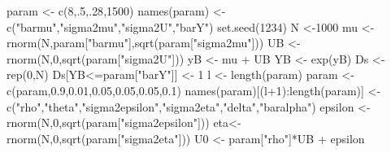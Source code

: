 \documentclass[
]{book}
\newenvironment{Shaded}{\begin{snugshade}}{\end{snugshade}}
\newcommand{\DecValTok}[1]{\textcolor[rgb]{0.00,0.00,0.81}{#1}}
\newcommand{\FloatTok}[1]{\textcolor[rgb]{0.00,0.00,0.81}{#1}}
\newcommand{\FunctionTok}[1]{\textcolor[rgb]{0.00,0.00,0.00}{#1}}
\newcommand{\NormalTok}[1]{#1}
\newcommand{\OtherTok}[1]{\textcolor[rgb]{0.56,0.35,0.01}{#1}}
\newcommand{\SpecialCharTok}[1]{\textcolor[rgb]{0.00,0.00,0.00}{#1}}
\newcommand{\StringTok}[1]{\textcolor[rgb]{0.31,0.60,0.02}{#1}}
\theoremstyle{definition}
\theoremstyle{definition}
\theoremstyle{definition}
\theoremstyle{definition}
\theoremstyle{remark}
\begin{document}
\begin{Shaded}
\begin{Highlighting}[]
\NormalTok{param }\OtherTok{\textless{}{-}} \FunctionTok{c}\NormalTok{(}\DecValTok{8}\NormalTok{,.}\DecValTok{5}\NormalTok{,.}\DecValTok{28}\NormalTok{,}\DecValTok{1500}\NormalTok{)}
\FunctionTok{names}\NormalTok{(param) }\OtherTok{\textless{}{-}} \FunctionTok{c}\NormalTok{(}\StringTok{"barmu"}\NormalTok{,}\StringTok{"sigma2mu"}\NormalTok{,}\StringTok{"sigma2U"}\NormalTok{,}\StringTok{"barY"}\NormalTok{)}
\FunctionTok{set.seed}\NormalTok{(}\DecValTok{1234}\NormalTok{)}
\NormalTok{N }\OtherTok{\textless{}{-}}\DecValTok{1000}
\NormalTok{mu }\OtherTok{\textless{}{-}} \FunctionTok{rnorm}\NormalTok{(N,param[}\StringTok{"barmu"}\NormalTok{],}\FunctionTok{sqrt}\NormalTok{(param[}\StringTok{"sigma2mu"}\NormalTok{]))}
\NormalTok{UB }\OtherTok{\textless{}{-}} \FunctionTok{rnorm}\NormalTok{(N,}\DecValTok{0}\NormalTok{,}\FunctionTok{sqrt}\NormalTok{(param[}\StringTok{"sigma2U"}\NormalTok{]))}
\NormalTok{yB }\OtherTok{\textless{}{-}}\NormalTok{ mu }\SpecialCharTok{+}\NormalTok{ UB}
\NormalTok{YB }\OtherTok{\textless{}{-}} \FunctionTok{exp}\NormalTok{(yB)}
\NormalTok{Ds }\OtherTok{\textless{}{-}} \FunctionTok{rep}\NormalTok{(}\DecValTok{0}\NormalTok{,N)}
\NormalTok{Ds[YB}\SpecialCharTok{\textless{}=}\NormalTok{param[}\StringTok{"barY"}\NormalTok{]] }\OtherTok{\textless{}{-}} \DecValTok{1}
\NormalTok{l }\OtherTok{\textless{}{-}} \FunctionTok{length}\NormalTok{(param)}
\NormalTok{param }\OtherTok{\textless{}{-}} \FunctionTok{c}\NormalTok{(param,}\FloatTok{0.9}\NormalTok{,}\FloatTok{0.01}\NormalTok{,}\FloatTok{0.05}\NormalTok{,}\FloatTok{0.05}\NormalTok{,}\FloatTok{0.05}\NormalTok{,}\FloatTok{0.1}\NormalTok{)}
\FunctionTok{names}\NormalTok{(param)[(l}\SpecialCharTok{+}\DecValTok{1}\NormalTok{)}\SpecialCharTok{:}\FunctionTok{length}\NormalTok{(param)] }\OtherTok{\textless{}{-}} \FunctionTok{c}\NormalTok{(}\StringTok{"rho"}\NormalTok{,}\StringTok{"theta"}\NormalTok{,}\StringTok{"sigma2epsilon"}\NormalTok{,}\StringTok{"sigma2eta"}\NormalTok{,}\StringTok{"delta"}\NormalTok{,}\StringTok{"baralpha"}\NormalTok{)}
\NormalTok{epsilon }\OtherTok{\textless{}{-}} \FunctionTok{rnorm}\NormalTok{(N,}\DecValTok{0}\NormalTok{,}\FunctionTok{sqrt}\NormalTok{(param[}\StringTok{"sigma2epsilon"}\NormalTok{]))}
\NormalTok{eta}\OtherTok{\textless{}{-}} \FunctionTok{rnorm}\NormalTok{(N,}\DecValTok{0}\NormalTok{,}\FunctionTok{sqrt}\NormalTok{(param[}\StringTok{"sigma2eta"}\NormalTok{]))}
\NormalTok{U0 }\OtherTok{\textless{}{-}}\NormalTok{ param[}\StringTok{"rho"}\NormalTok{]}\SpecialCharTok{*}\NormalTok{UB }\SpecialCharTok{+}\NormalTok{ epsilon}

\end{Highlighting}
\end{Shaded}
\end{document}
